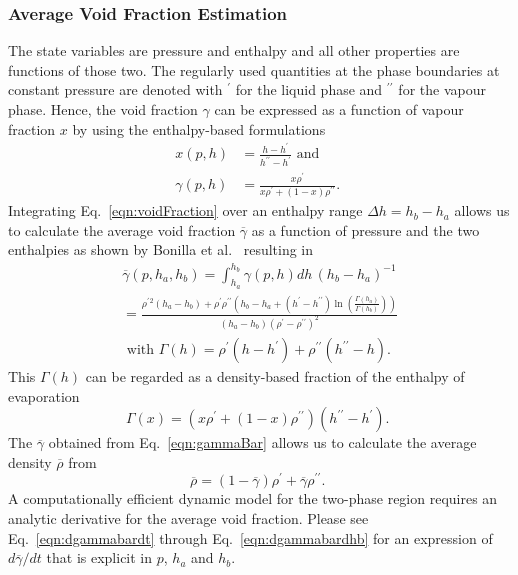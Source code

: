 \documentclass[11pt]{article} %
\begin{document}
\subsubsection{Average Void Fraction Estimation}\label{subsubsec:avgVoidFrac}
\newcommand{\rhop}{\ensuremath{\rho^\prime}}
\newcommand{\rhopp}{\ensuremath{\rho^{\prime\prime}}}
\newcommand{\hp}{\ensuremath{h^\prime}}
\newcommand{\hpp}{\ensuremath{h^{\prime\prime}}}
The state variables are pressure and enthalpy and all other properties are functions of those two. The regularly used quantities at the phase boundaries at constant pressure are denoted with $^\prime$ for the liquid phase and $^{\prime\prime}$ for the vapour phase. Hence, the void fraction $\gamma$ can be expressed as a function of vapour fraction $x$ by using the enthalpy-based formulations
\begin{align}
x(p,h)      &= \frac{h-\hp}{\hpp-\hp} \text{ and } \label{eqn:vapourFraction} \\
\gamma(p,h) &= \frac{x \rhop}{ x \rhop + \left( 1 - x \right) \rhopp }\text{. } \label{eqn:voidFraction}
\end{align}
Integrating Eq.~\ref{eqn:voidFraction} over an enthalpy range $\Delta h = h_b - h_a$ allows us to calculate the average void fraction $\overline{\gamma}$ as a function of pressure and the two enthalpies as shown by Bonilla et al.~\cite{Bonilla2015} resulting in 
\begin{gather}
\overline{\gamma}(p,h_a,h_b) = \int_{h_a}^{h_b}\!\!\!\!\!\!\!\!  \gamma(p,h)dh \, \left(h_b - h_a \right)^{-1} \\
= \frac{\rhop{}^2 \left(h_a-h_b\right) + \rhop\rhopp \left(h_b-h_a+\left(\hp-\hpp\right) \ln \left(\frac{\Gamma\left(h_a\right)}{\Gamma\left(h_b\right)}\right)\right)}
{\left(h_a-h_b\right) \left( \rhop-\rhopp \right)^2 } \label{eqn:gammaBar} \\
\text{ with } \Gamma(h) = \rhop (h-\hp) + \rhopp (\hpp-h) \text{. } \label{eqn:Gamma} 
\end{gather}
This $\Gamma(h)$ can be regarded as a density-based fraction of the enthalpy of evaporation 
\begin{equation}
\Gamma(x) = \left( x \rhop + (1-x) \rhopp \right) \left( \hpp-\hp \right) \text{. }
\end{equation}
The $\overline{\gamma}$ obtained from Eq.~\ref{eqn:gammaBar} allows us to calculate the average density $\overline{\rho}$ from 
\begin{equation}
\overline{\rho} = (1-\overline{\gamma}) \rhop + \overline{\gamma} \rhopp \text{. }
\end{equation}
A computationally efficient dynamic model for the two-phase region requires an analytic derivative for the average void fraction. Please see Eq.~\ref{eqn:dgammabardt} through Eq.~\ref{eqn:dgammabardhb} for an expression of $d\overline{\gamma}/dt$ that is explicit in $p$, $h_a$ and $h_b$. 
\end{document}
